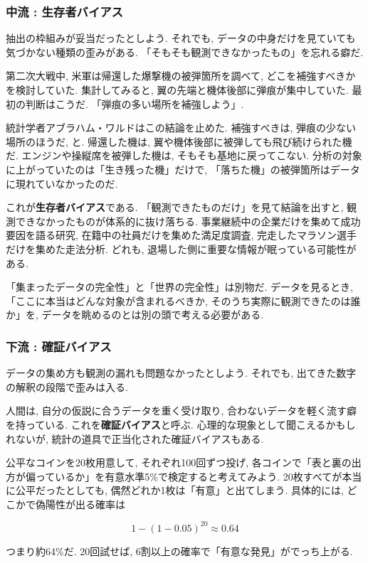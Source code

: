 \subsubsection*{中流 : 生存者バイアス}

抽出の枠組みが妥当だったとしよう. それでも, データの中身だけを見ていても気づかない種類の歪みがある.
「そもそも観測できなかったもの」を忘れる癖だ.

第二次大戦中, 米軍は帰還した爆撃機の被弾箇所を調べて, どこを補強すべきかを検討していた.
集計してみると, 翼の先端と機体後部に弾痕が集中していた.
最初の判断はこうだ. 「弾痕の多い場所を補強しよう」.

統計学者アブラハム・ワルドはこの結論を止めた.
補強すべきは, 弾痕の少ない場所のほうだ, と.
帰還した機は, 翼や機体後部に被弾しても飛び続けられた機だ.
エンジンや操縦席を被弾した機は, そもそも基地に戻ってこない.
分析の対象に上がっていたのは「生き残った機」だけで, 「落ちた機」の被弾箇所はデータに現れていなかったのだ.

これが\textbf{生存者バイアス}である.
「観測できたものだけ」を見て結論を出すと, 観測できなかったものが体系的に抜け落ちる.
事業継続中の企業だけを集めて成功要因を語る研究, 在籍中の社員だけを集めた満足度調査, 完走したマラソン選手だけを集めた走法分析.
どれも, 退場した側に重要な情報が眠っている可能性がある.

「集まったデータの完全性」と「世界の完全性」は別物だ.
データを見るとき, 「ここに本当はどんな対象が含まれるべきか, そのうち実際に観測できたのは誰か」を, データを眺めるのとは別の頭で考える必要がある.

\subsubsection*{下流 : 確証バイアス}

データの集め方も観測の漏れも問題なかったとしよう.
それでも, 出てきた数字の解釈の段階で歪みは入る.

人間は, 自分の仮説に合うデータを重く受け取り, 合わないデータを軽く流す癖を持っている.
これを\textbf{確証バイアス}と呼ぶ.
心理的な現象として聞こえるかもしれないが, 統計の道具で正当化された確証バイアスもある.

公平なコインを20枚用意して, それぞれ100回ずつ投げ, 各コインで「表と裏の出方が偏っているか」を有意水準5\%で検定すると考えてみよう.
20枚すべてが本当に公平だったとしても, 偶然どれか1枚は「有意」と出てしまう.
具体的には, どこかで偽陽性が出る確率は

$$
1 - (1 - 0.05)^{20} \approx 0.64
$$

つまり約64\%だ. 20回試せば, 6割以上の確率で「有意な発見」がでっち上がる.

